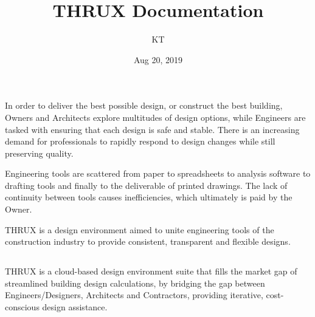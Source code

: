 \documentclass[letterpaper,10pt,english]{sphinxmanual}
\title{THRUX Documentation}
\date{Aug 20, 2019}
\author{KT}
\begin{document}
\pagestyle{empty}
\sphinxmaketitle
\pagestyle{plain}
\sphinxtableofcontents
\pagestyle{normal}
\label{\detokenize{docs/index::doc}}



\chapter{}
\label{\detokenize{docs/introduction/index-thrux:introduction}}\label{\detokenize{docs/introduction/index-thrux::doc}}
In order to deliver the best possible design, or construct the best building, Owners and Architects explore multitudes of design options, while Engineers are tasked with ensuring that each design is safe and stable.  There is an increasing demand for professionals to rapidly respond to design changes while still preserving quality.

Engineering tools are scattered from paper to spreadsheets to analysis software to drafting tools and finally to the deliverable of printed drawings.  The lack of continuity between tools causes inefficiencies, which ultimately is paid by the Owner.

THRUX is a design environment aimed to unite engineering tools of the construction industry to provide consistent, transparent and flexible designs.


\section{}
\label{\detokenize{docs/introduction/index-thrux:what-is-thrux}}
THRUX is a cloud-based design environment suite that fills the market gap of streamlined building design calculations, by bridging the gap between Engineers/Designers, Architects and Contractors, providing iterative, cost-conscious design assistance.
\end{document}
